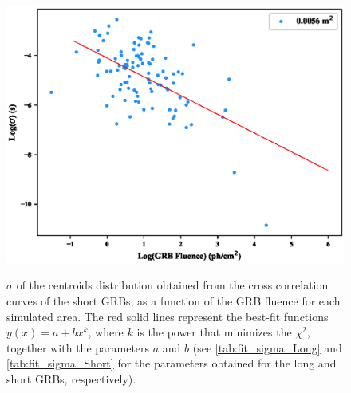 \documentclass[]{spie}  %
\begin{document}
\begin{figure}[h!]
\includegraphics[scale=0.5,angle=0]{fig/SHORT/sigma_vs_fluence_0.0056.eps}\\

\caption{$\sigma$ of the centroids distribution obtained from the cross correlation curves of the short GRBs, as a function of the GRB fluence for each simulated area. The red solid lines represent the best-fit functions $y(x)=a+bx^{k}$, where $k$ is the power that minimizes the $\chi^2$, together with the parameters $a$ and $b$  (see \autoref{tab:fit_sigma_Long} and \autoref{tab:fit_sigma_Short} for the parameters obtained for the long and short GRBs, respectively).}
\label{fig:sigma_vs_Fluence_Short}
\end{figure}
\end{document}

